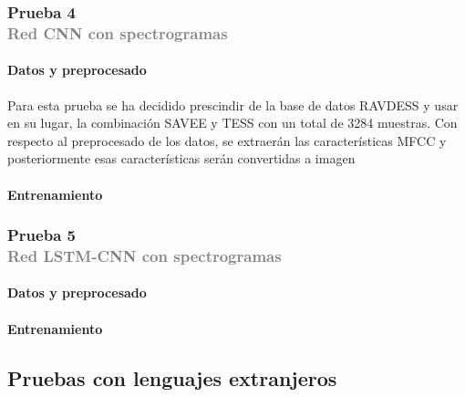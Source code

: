 \documentclass[11pt,a4paper,spanish]{book}
\begin{document}
	\subsubsection[]{\large Prueba 4\\ {\normalsize \textcolor{Gray}{Red CNN con spectrogramas}}}
	\hfill\begin{minipage}{\dimexpr\textwidth-1cm}
		
		\paragraph{Datos y preprocesado} Para esta prueba se ha decidido prescindir de la base de datos RAVDESS y usar en su lugar, la combinación SAVEE y TESS con un total de 3284 muestras. Con respecto al preprocesado de los datos, se extraerán las características MFCC y posteriormente esas características serán convertidas a imagen
		\paragraph{Entrenamiento}
		
	\end{minipage}
	\subsubsection[]{\large Prueba 5\\ {\normalsize \textcolor{Gray}{Red LSTM-CNN con spectrogramas}}}
	\hfill\begin{minipage}{\dimexpr\textwidth-1cm}
		
		\paragraph{Datos y preprocesado} 
		\paragraph{Entrenamiento}
		
	\end{minipage}

	\subsection{Pruebas con lenguajes extranjeros}
	
	
	
	
	

		
		
		

	
	
	
		\printbibliography
	
\end{document}
